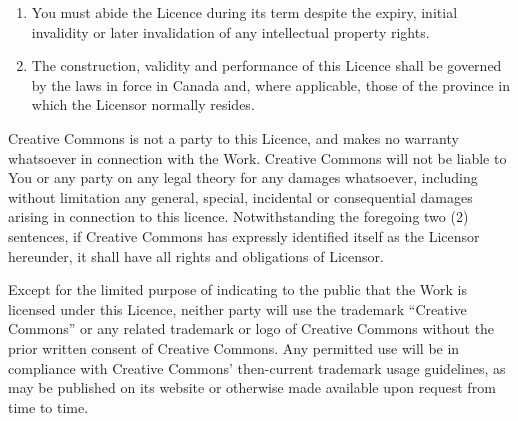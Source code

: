 \begin{enumerate}
\begin{enumerate}
         \item You must abide the Licence during its term despite the expiry, initial invalidity or later invalidation of any intellectual property rights.
         \item The construction, validity and performance of this Licence shall be governed by the laws in force in Canada and, where applicable, those of the province in which the Licensor normally resides.
	\end{enumerate}
\end{enumerate}

Creative Commons is not a party to this Licence, and makes no warranty whatsoever in connection with the Work. Creative Commons will not be liable to You or any party on any legal theory for any damages whatsoever, including without limitation any general, special, incidental or consequential damages arising in connection to this licence. Notwithstanding the foregoing two (2) sentences, if Creative Commons has expressly identified itself as the Licensor hereunder, it shall have all rights and obligations of Licensor.

Except for the limited purpose of indicating to the public that the Work is licensed under this Licence, neither party will use the trademark ``Creative Commons'' or any related trademark or logo of Creative Commons without the prior written consent of Creative Commons. Any permitted use will be in compliance with Creative Commons' then-current trademark usage guidelines, as may be published on its website or otherwise made available upon request from time to time.
